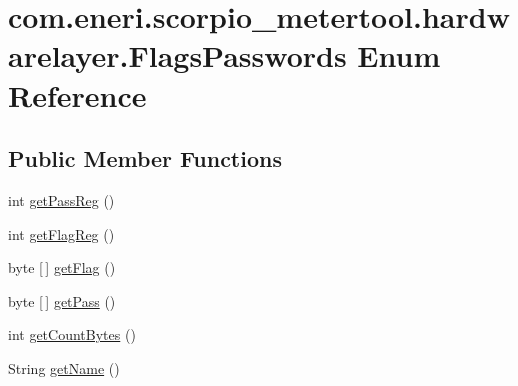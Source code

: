 \hypertarget{enumcom_1_1eneri_1_1scorpio__metertool_1_1hardwarelayer_1_1_flags_passwords}{}\section{com.\+eneri.\+scorpio\+\_\+metertool.\+hardwarelayer.\+Flags\+Passwords Enum Reference}
\label{enumcom_1_1eneri_1_1scorpio__metertool_1_1hardwarelayer_1_1_flags_passwords}
\subsection*{Public Member Functions}
\begin{DoxyCompactItemize}
\item 
int \hyperlink{enumcom_1_1eneri_1_1scorpio__metertool_1_1hardwarelayer_1_1_flags_passwords_ac6941e42ea9d08866489bf08bd171269}{get\+Pass\+Reg} ()
\item 
int \hyperlink{enumcom_1_1eneri_1_1scorpio__metertool_1_1hardwarelayer_1_1_flags_passwords_a650a93a6e4dbd5a7e39d88023823da6a}{get\+Flag\+Reg} ()
\item 
byte \mbox{[}$\,$\mbox{]} \hyperlink{enumcom_1_1eneri_1_1scorpio__metertool_1_1hardwarelayer_1_1_flags_passwords_a4dc78014e1a1316e39408a70e9114d66}{get\+Flag} ()
\item 
byte \mbox{[}$\,$\mbox{]} \hyperlink{enumcom_1_1eneri_1_1scorpio__metertool_1_1hardwarelayer_1_1_flags_passwords_a5ad89e0fd9f4a0fee566c6f45a4d4810}{get\+Pass} ()
\item 
int \hyperlink{enumcom_1_1eneri_1_1scorpio__metertool_1_1hardwarelayer_1_1_flags_passwords_a8788143d1fd3706c5d45d02a2a4910de}{get\+Count\+Bytes} ()
\item 
String \hyperlink{enumcom_1_1eneri_1_1scorpio__metertool_1_1hardwarelayer_1_1_flags_passwords_a8332e7af6d7b6cc4e19c981f927116c8}{get\+Name} ()
\end{DoxyCompactItemize}
